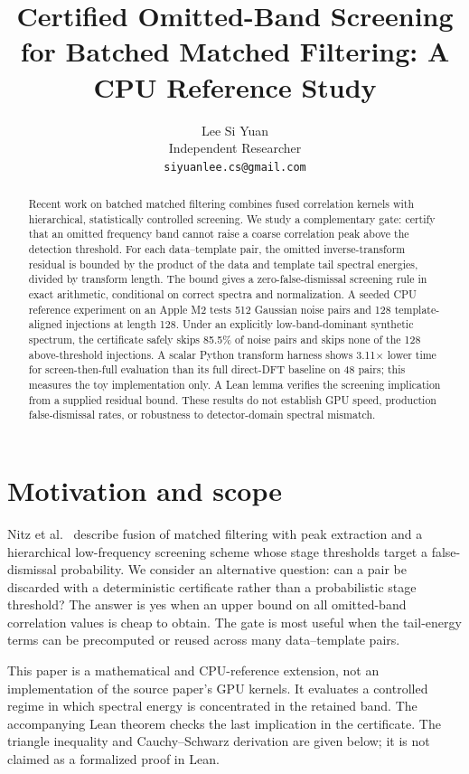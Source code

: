 \documentclass[11pt]{article}
\title{Certified Omitted-Band Screening for Batched Matched Filtering: A CPU Reference Study}
\author{Lee Si Yuan \\
  Independent Researcher \\
  \texttt{siyuanlee.cs@gmail.com}}
\date{}
\begin{document}
\maketitle
\begin{abstract}
Recent work on batched matched filtering combines fused correlation kernels with hierarchical, statistically controlled screening. We study a complementary gate: certify that an omitted frequency band cannot raise a coarse correlation peak above the detection threshold. For each data--template pair, the omitted inverse-transform residual is bounded by the product of the data and template tail spectral energies, divided by transform length. The bound gives a zero-false-dismissal screening rule in exact arithmetic, conditional on correct spectra and normalization. A seeded CPU reference experiment on an Apple M2 tests 512 Gaussian noise pairs and 128 template-aligned injections at length 128. Under an explicitly low-band-dominant synthetic spectrum, the certificate safely skips 85.5\% of noise pairs and skips none of the 128 above-threshold injections. A scalar Python transform harness shows 3.11$\times$ lower time for screen-then-full evaluation than its full direct-DFT baseline on 48 pairs; this measures the toy implementation only. A Lean lemma verifies the screening implication from a supplied residual bound. These results do not establish GPU speed, production false-dismissal rates, or robustness to detector-domain spectral mismatch.
\end{abstract}

\section{Motivation and scope}
Nitz et al.~\cite{nitz2026} describe fusion of matched filtering with peak extraction and a hierarchical low-frequency screening scheme whose stage thresholds target a false-dismissal probability. We consider an alternative question: can a pair be discarded with a deterministic certificate rather than a probabilistic stage threshold? The answer is yes when an upper bound on all omitted-band correlation values is cheap to obtain. The gate is most useful when the tail-energy terms can be precomputed or reused across many data--template pairs.

This paper is a mathematical and CPU-reference extension, not an implementation of the source paper's GPU kernels. It evaluates a controlled regime in which spectral energy is concentrated in the retained band. The accompanying Lean theorem checks the last implication in the certificate. The triangle inequality and Cauchy--Schwarz derivation are given below; it is not claimed as a formalized proof in Lean.
\end{document}
